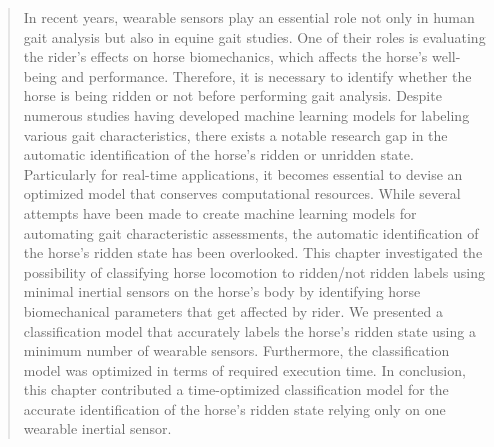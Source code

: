 \begin{quote}

In recent years, wearable sensors play an essential role not only in human gait analysis but also in equine gait studies. One of their roles is evaluating the rider’s effects on horse biomechanics, which affects the horse's well-being and performance. Therefore, it is necessary to identify whether the horse is being ridden or not before performing gait analysis. Despite numerous studies having developed machine learning models for labeling various gait characteristics, there exists a notable research gap in the automatic identification of the horse's ridden or unridden state. Particularly for real-time applications, it becomes essential to devise an optimized model that conserves computational resources. While several attempts have been made to create machine learning models for automating gait characteristic assessments, the automatic identification of the horse's ridden state has been overlooked. This chapter investigated the possibility of classifying horse locomotion to ridden/not ridden labels using minimal inertial sensors on the horse's body by identifying horse biomechanical parameters that get affected by rider. We presented a classification model that accurately labels the horse's ridden state using a minimum number of wearable sensors. Furthermore, the classification model was optimized in terms of required execution time. In conclusion, this chapter contributed a time-optimized classification model for the accurate identification of the horse's ridden state relying only on one wearable inertial sensor.

\end{quote}

